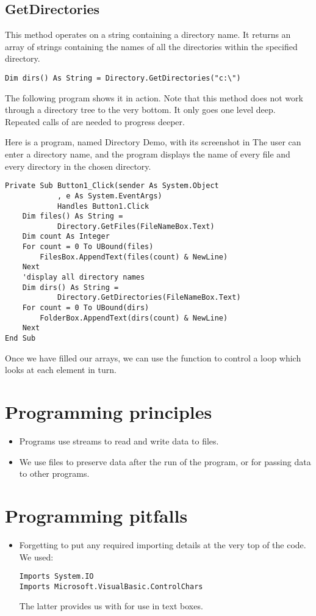 		\subsection*{GetDirectories}
			This method operates on a string containing a directory name. It returns an array of strings containing the names of all the directories within the specified directory.
		\begin{lstlisting}
Dim dirs() As String = Directory.GetDirectories("c:\")
		\end{lstlisting}
		The following program shows it in action. Note that this method does not work through a directory tree to the very bottom. It only goes one level deep. Repeated calls of  are needed to progress deeper.
		
		Here is a program, named Directory Demo, with its screenshot in  The user can enter a directory name, and the program displays the name of every file and every directory in the chosen directory.
		\begin{lstlisting}
Private Sub Button1_Click(sender As System.Object
			, e As System.EventArgs)
			Handles Button1.Click
	Dim files() As String =
			Directory.GetFiles(FileNameBox.Text)
	Dim count As Integer
	For count = 0 To UBound(files)
		FilesBox.AppendText(files(count) & NewLine)
	Next
	'display all directory names
	Dim dirs() As String =
			Directory.GetDirectories(FileNameBox.Text)
	For count = 0 To UBound(dirs)
		FolderBox.AppendText(dirs(count) & NewLine)
	Next
End Sub
		\end{lstlisting}
		Once we have filled our arrays, we can use the  function to control a loop which looks at each element in turn.

		
	\section{Programming principles}
		\begin{itemize}
      \item Programs use streams to read and write data to files.
      \item We use files to preserve data after the run of the program, or for passing data to other programs.
		\end{itemize}


	\section{Programming pitfalls}
		\begin{itemize}
      \item Forgetting to put any required importing details at the very top of the code. We used:
		\begin{lstlisting}
Imports System.IO
Imports Microsoft.VisualBasic.ControlChars
		\end{lstlisting}
		The latter provides us with  for use in text boxes.
		\end{itemize}


